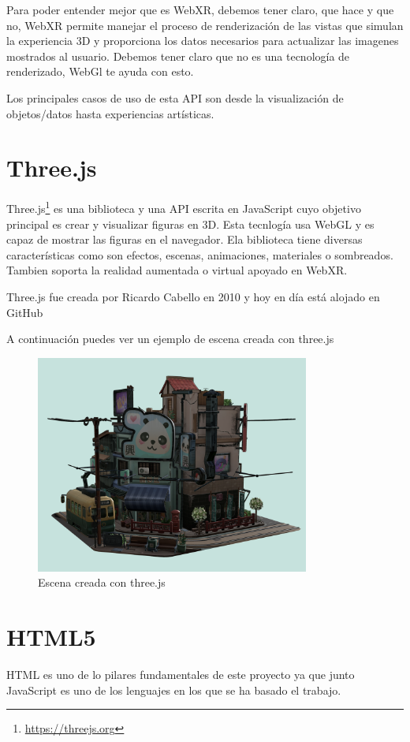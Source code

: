 \documentclass[a4paper, 12pt]{book}
\begin{document}
Para poder entender mejor que es WebXR, debemos tener claro, que hace y que no, WebXR permite manejar el proceso de renderización de las vistas que simulan la experiencia 3D y proporciona los datos necesarios para actualizar las imagenes mostrados al usuario. Debemos tener claro que no es una tecnología de renderizado, WebGl te ayuda con esto.

Los principales casos de uso de esta API son desde la visualización de objetos/datos hasta experiencias artísticas. 

\section{Three.js} %
\label{sec:Three}
Three.js\footnote{\url{https://threejs.org}} es una biblioteca y una API escrita en JavaScript cuyo objetivo principal es crear y visualizar figuras en 3D. Esta tecnlogía usa WebGL y es capaz de mostrar las figuras en el navegador. Ela biblioteca tiene diversas características como son efectos, escenas, animaciones, materiales o sombreados. Tambien soporta la realidad aumentada o virtual apoyado en WebXR.

Three.js fue creada por Ricardo Cabello en 2010 y hoy en día está alojado en GitHub

A continuación puedes ver un ejemplo de escena creada con three.js
\begin{figure}
  \centering
  \includegraphics[width=9cm, keepaspectratio]{img/threejs.png}
  \caption{Escena creada con three.js}\label{fig:three}
\end{figure}


\section{HTML5} %
\label{sec:HTML5}
HTML es uno de lo pilares fundamentales de este proyecto ya que junto JavaScript es uno de los lenguajes en los que se ha basado el trabajo.
\end{document}
